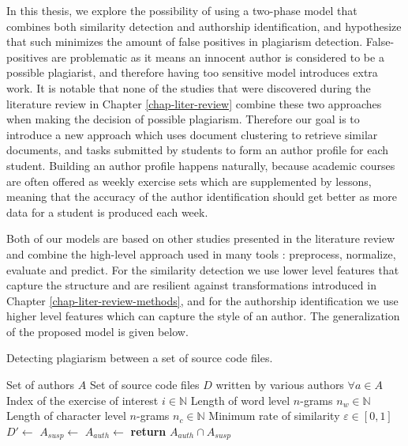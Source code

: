 
In this thesis, we explore the possibility of using a two-phase model that combines both similarity detection and authorship identification, and hypothesize that such minimizes the amount of false positives in plagiarism detection. False-positives are problematic as it means an innocent author is considered to be a possible plagiarist, and therefore having too sensitive model introduces extra work. It is notable that none of the studies that were discovered during the literature review in Chapter \ref{chap-liter-review} combine these two approaches when making the decision of possible plagiarism. Therefore our goal is to introduce a new approach which uses document clustering to retrieve similar documents, and tasks submitted by students to form an author profile for each student. Building an author profile happens naturally, because academic courses are often offered as weekly exercise sets which are supplemented by lessons, meaning that the accuracy of the author identification should get better as more data for a student is produced each week.   


Both of our models are based on other studies presented in the literature review and combine the high-level approach used in many tools \cite{RSCAD2016}: preprocess, normalize, evaluate and predict. For the similarity detection we use lower level features that capture the structure and are resilient against transformations introduced in Chapter \ref{chap-liter-review-methods}, and for the authorship identification we use higher level features which can capture the style of an author. The generalization of the proposed model is given below.

\begin{algorithm}[ht]
\caption{Detecting plagiarism between a set of source code files.}
\label{alg-toplvl}
\begin{algorithmic}

\Require Set of authors $A$
\Require Set of source code files $D$ written by various authors $\forall a \in A$
\Require Index of the exercise of interest $i \in \mathbb{N}$
\Require Length of word level $n$-grams $n_w \in \mathbb{N}$
\Require Length of character level $n$-grams $n_c \in \mathbb{N}$
\Require Minimum rate of similarity $\varepsilon \in [0, 1]$
   \State $D'\gets$ 
   \State $A_{susp} \gets$ 
   \State $A_{auth} \gets$ 
   \State \textbf{return} $A_{auth} \cap A_{susp}$
\EndProcedure

\end{algorithmic}
\end{algorithm}

